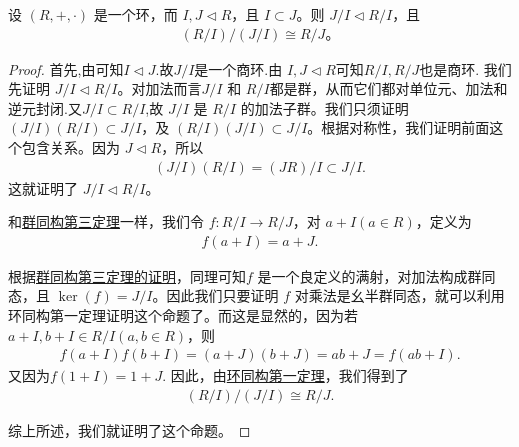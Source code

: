 \documentclass[../../main.tex]{subfiles}
\begin{document}
\begin{theorem}[环同构第三定理]\label{theorem:环同构第三定理}
设 $(R, +, \cdot)$ 是一个环，而 $I, J \lhd R$，且 $I \subset J$。则 $J / I \lhd R / I$，且
\begin{align*}
(R / I) / (J / I) \cong R / J 。
\end{align*}
\end{theorem}
\begin{proof}
首先,由可知$I\lhd J$.故$J / I$是一个商环.由 $I, J \lhd R$可知$R/I,R/J$也是商环.
我们先证明 $J / I \lhd R / I$。对加法而言$J / I$ 和 $R / I$都是群，从而它们都对单位元、加法和逆元封闭.又$J / I\subset R / I$,故 $J / I$ 是 $R / I$ 的加法子群。我们只须证明 $(J / I)(R / I) \subset J / I$，及 $(R / I)(J / I) \subset J / I$。根据对称性，我们证明前面这个包含关系。因为 $J \lhd R$，所以
\begin{align*}
(J / I)(R / I) = (JR) / I \subset J / I .
\end{align*}
这就证明了 $J / I \lhd R / I$。

和\hyperref[theorem:群同构第三定理]{群同构第三定理}一样，我们令 $f : R / I \to R / J$，对 $a + I (a \in R)$，定义为
\begin{align*}
f(a + I) = a + J .
\end{align*}

根据\hyperref[theorem:群同构第三定理]{群同构第三定理的证明}，同理可知$f$ 是一个良定义的满射，对加法构成群同态，且 $\ker(f) = J / I$。因此我们只要证明 $f$ 对乘法是幺半群同态，就可以利用环同构第一定理证明这个命题了。而这是显然的，因为若 $a + I, b + I \in R / I (a, b \in R)$，则
\begin{align*}
f(a + I)f(b + I) = (a + J)(b + J) = ab + J = f(ab + I).
\end{align*}
又因为$f(1+I)=1+J$.
因此，由\hyperref[theorem:环同构第一定理]{环同构第一定理}，我们得到了
\begin{align}
(R / I) / (J / I) \cong R / J.
\end{align}

综上所述，我们就证明了这个命题。 
\end{proof}
\end{document}
